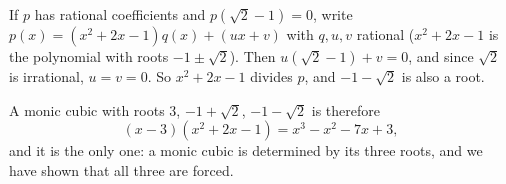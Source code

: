 If $p$ has rational coefficients and $p(\sqrt2-1)=0$, write $p(x)=(x^2+2x-1)q(x)+(ux+v)$ with $q,u,v$ rational ($x^2+2x-1$ is the polynomial with roots $-1\pm\sqrt2$). Then $u(\sqrt2-1)+v=0$, and since $\sqrt2$ is irrational, $u=v=0$. So $x^2+2x-1$ divides $p$, and $-1-\sqrt2$ is also a root.

A monic cubic with roots $3$, $-1+\sqrt2$, $-1-\sqrt2$ is therefore
\[
(x-3)(x^2+2x-1)=\boxed{x^3-x^2-7x+3},
\]
and it is the only one: a monic cubic is determined by its three roots, and we have shown that all three are forced.
